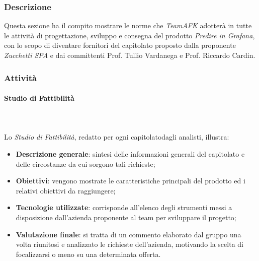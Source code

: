 		\subsubsection{Descrizione}
		Questa sezione ha il compito mostrare le norme che \textit{TeamAFK} adotterà in tutte le attività di progettazione, sviluppo e consegna del prodotto \textit{Predire in Grafana}, con lo scopo di diventare fornitori del capitolato proposto dalla proponente \textit{Zucchetti SPA} e dai committenti Prof. Tullio Vardanega e Prof. Riccardo Cardin.
		\subsubsection{Attività}
			\paragraph{Studio di Fattibilità} \mbox{} \\ \mbox{} \\
			Lo \textit{Studio di Fattibilità}, redatto per ogni capitolato\glo dagli analisti, illustra:
			\begin{itemize}
				\item \textbf{Descrizione generale}: sintesi delle informazioni generali del capitolato e delle circostanze da cui sorgono tali richieste;
				\item \textbf{Obiettivi}: vengono mostrate le caratteristiche principali del prodotto ed i relativi obiettivi da raggiungere;
				\item \textbf{Tecnologie utilizzate}: corrisponde all'elenco degli strumenti messi a disposizione dall'azienda proponente al team per sviluppare il progetto;
				\item \textbf{Valutazione finale}: si tratta di un commento elaborato dal gruppo una volta riunitosi e analizzato le  richieste dell'azienda, motivando la scelta di focalizzarsi o meno su una determinata offerta.
			\end{itemize}

